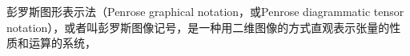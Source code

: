

彭罗斯图形表示法（Penrose graphical notation，或Penrose diagrammatic tensor notation），或者叫彭罗斯图像记号，是一种用二维图像的方式直观表示张量的性质和运算的系统，




































